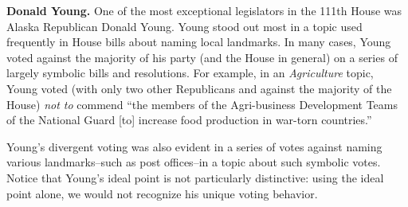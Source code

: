 
\textbf{Donald Young.} One of the most exceptional legislators in the
111th House was Alaska Republican Donald Young.  Young stood out most
in a topic used frequently in House bills about naming local
landmarks. In many cases, Young voted against the majority of his
party (and the House in general) on a series of largely symbolic bills
and resolutions.  For example, in an \emph{Agriculture} topic, Young
voted (with only two other Republicans and against the majority of the
House) \emph{not to} commend ``the members of the Agri-business
Development Teams of the National Guard [to] increase food production
in war-torn countries.''

Young's divergent voting was also evident in a series of
votes against naming various landmarks--such as post offices--in a
topic about such symbolic votes.  Notice that Young's ideal point is
not particularly distinctive: using the ideal point alone, we would
not recognize his unique voting behavior.




